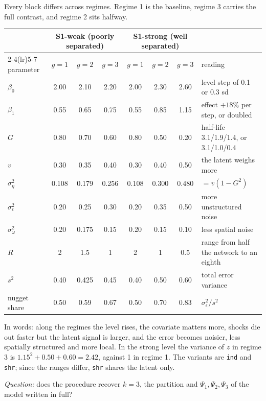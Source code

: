 \documentclass[11pt]{article}
\begin{document}
Every block differs across regimes. Regime 1 is the baseline, regime 3 carries the full contrast, and regime 2 sits halfway.
\begin{center}
\footnotesize
\setlength{\tabcolsep}{4pt}
\begin{tabular}{l ccc ccc >{\raggedright\arraybackslash}p{3.9cm}}
\toprule
& \multicolumn{3}{c}{S1-weak (poorly separated)} & \multicolumn{3}{c}{S1-strong (well separated)} & \\
\cmidrule(lr){2-4}\cmidrule(lr){5-7}
parameter & $g=1$ & $g=2$ & $g=3$ & $g=1$ & $g=2$ & $g=3$ & reading \\
\midrule
$\beta_0$ & 2.00 & 2.10 & 2.20 & 2.00 & 2.30 & 2.60 & level step of 0.1 or 0.3 sd \\
$\beta_1$ & 0.55 & 0.65 & 0.75 & 0.55 & 0.85 & 1.15 & effect $+18\%$ per step, or doubled \\
$G$ & 0.80 & 0.70 & 0.60 & 0.80 & 0.50 & 0.20 & half-life 3.1/1.9/1.4, or 3.1/1.0/0.4 \\
$v$ & 0.30 & 0.35 & 0.40 & 0.30 & 0.40 & 0.50 & the latent weighs more \\
$\sigma^2_\eta$ & 0.108 & 0.179 & 0.256 & 0.108 & 0.300 & 0.480 & $= v(1-G^2)$ \\
$\sigma^2_\epsilon$ & 0.20 & 0.25 & 0.30 & 0.20 & 0.35 & 0.50 & more unstructured noise \\
$\sigma^2_\omega$ & 0.20 & 0.175 & 0.15 & 0.20 & 0.15 & 0.10 & less spatial noise \\
$R$ & 2 & 1.5 & 1 & 2 & 1 & 0.5 & range from half the network to an eighth \\
\midrule
$s^2$ & 0.40 & 0.425 & 0.45 & 0.40 & 0.50 & 0.60 & total error variance \\
nugget share & 0.50 & 0.59 & 0.67 & 0.50 & 0.70 & 0.83 & $\sigma^2_\epsilon/s^2$ \\
\bottomrule
\end{tabular}
\end{center}
In words: along the regimes the level rises, the covariate matters more, shocks die out faster but the latent signal is larger, and the error becomes noisier, less spatially structured and more local. In the strong level the variance of $z$ in regime 3 is $1.15^2 + 0.50 + 0.60 = 2.42$, against 1 in regime 1. The variants are \texttt{ind} and \texttt{shr}; since the ranges differ, \texttt{shr} shares the latent only.

\emph{Question:} does the procedure recover $k = 3$, the partition and $\Psi_1,\Psi_2,\Psi_3$ of the model written in full?
\end{document}
